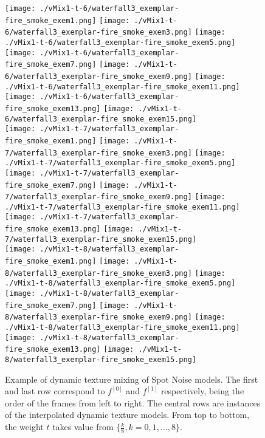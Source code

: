\begin{figure}[ht!]
{\vspace{1mm}
    \texttt{[image: ./vMix1-t-6/waterfall3\_exemplar-fire\_smoke\_exem1.png]}
    \texttt{[image: ./vMix1-t-6/waterfall3\_exemplar-fire\_smoke\_exem3.png]}
    \texttt{[image: ./vMix1-t-6/waterfall3\_exemplar-fire\_smoke\_exem5.png]}
    \texttt{[image: ./vMix1-t-6/waterfall3\_exemplar-fire\_smoke\_exem7.png]}
    \texttt{[image: ./vMix1-t-6/waterfall3\_exemplar-fire\_smoke\_exem9.png]}
    \texttt{[image: ./vMix1-t-6/waterfall3\_exemplar-fire\_smoke\_exem11.png]}
    \texttt{[image: ./vMix1-t-6/waterfall3\_exemplar-fire\_smoke\_exem13.png]}
    \texttt{[image: ./vMix1-t-6/waterfall3\_exemplar-fire\_smoke\_exem15.png]} \\
\vspace{1mm}
    \texttt{[image: ./vMix1-t-7/waterfall3\_exemplar-fire\_smoke\_exem1.png]}
    \texttt{[image: ./vMix1-t-7/waterfall3\_exemplar-fire\_smoke\_exem3.png]}
    \texttt{[image: ./vMix1-t-7/waterfall3\_exemplar-fire\_smoke\_exem5.png]}
    \texttt{[image: ./vMix1-t-7/waterfall3\_exemplar-fire\_smoke\_exem7.png]}
    \texttt{[image: ./vMix1-t-7/waterfall3\_exemplar-fire\_smoke\_exem9.png]}
    \texttt{[image: ./vMix1-t-7/waterfall3\_exemplar-fire\_smoke\_exem11.png]}
    \texttt{[image: ./vMix1-t-7/waterfall3\_exemplar-fire\_smoke\_exem13.png]}
    \texttt{[image: ./vMix1-t-7/waterfall3\_exemplar-fire\_smoke\_exem15.png]} \\
\vspace{1mm}
    \texttt{[image: ./vMix1-t-8/waterfall3\_exemplar-fire\_smoke\_exem1.png]}
    \texttt{[image: ./vMix1-t-8/waterfall3\_exemplar-fire\_smoke\_exem3.png]}
    \texttt{[image: ./vMix1-t-8/waterfall3\_exemplar-fire\_smoke\_exem5.png]}
    \texttt{[image: ./vMix1-t-8/waterfall3\_exemplar-fire\_smoke\_exem7.png]}
    \texttt{[image: ./vMix1-t-8/waterfall3\_exemplar-fire\_smoke\_exem9.png]}
    \texttt{[image: ./vMix1-t-8/waterfall3\_exemplar-fire\_smoke\_exem11.png]}
    \texttt{[image: ./vMix1-t-8/waterfall3\_exemplar-fire\_smoke\_exem13.png]}
    \texttt{[image: ./vMix1-t-8/waterfall3\_exemplar-fire\_smoke\_exem15.png]} \\
}
    \caption{
        Example of dynamic texture mixing of Spot Noise models. The first and last row correspond to $f^{[0]}$ and $f^{[1]}$ respectively, being the order of the frames from left to right.
        The central rows are instances of the interpolated dynamic texture models.
        From top to bottom, the weight $t$ takes value from $\{\frac{k}{8}, k = 0, 1, \ldots, 8\}$.
    }
\label{fig:dynamic-mix-sn}
\end{figure}

